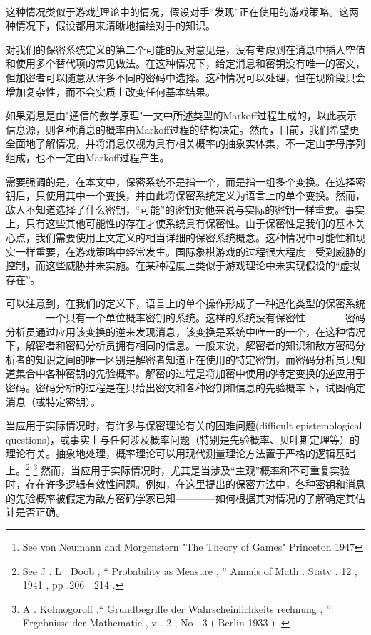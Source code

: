 \documentclass[]{article}
\begin{document}
这种情况类似于游戏\footnote{ See von Neumann and Morgenstern	"The Theory of Games" Princeton 1947}理论中的情况，假设对手“发现”正在使用的游戏策略。这两种情况下，假设都用来清晰地描绘对手的知识。


对我们的保密系统定义的第二个可能的反对意见是，没有考虑到在消息中插入空值和使用多个替代项的常见做法。在这种情况下，给定消息和密钥没有唯一的密文，但加密者可以随意从许多不同的密码中选择。这种情况可以处理，但在现阶段只会增加复杂性，而不会实质上改变任何基本结果。

如果消息是由"通信的数学原理"一文中所述类型的Markoff过程生成的，以此表示信息源，则各种消息的概率由Markoff过程的结构决定。然而，目前，我们希望更全面地了解情况，并将消息仅视为具有相关概率的抽象实体集，不一定由字母序列组成，也不一定由Markoff过程产生。

需要强调的是，在本文中，保密系统不是指一个，而是指一组多个变换。在选择密钥后，只使用其中一个变换，并由此将保密系统定义为语言上的单个变换。然而，敌人不知道选择了什么密钥，“可能”的密钥对他来说与实际的密钥一样重要。事实上，只有这些其他可能性的存在才使系统具有保密性。由于保密性是我们的基本关心点，我们需要使用上文定义的相当详细的保密系统概念。这种情况中可能性和现实一样重要，在游戏策略中经常发生。国际象棋游戏的过程很大程度上受到威胁的控制，而这些威胁并未实施。在某种程度上类似于游戏理论中未实现假设的“虚拟存在”。

可以注意到，在我们的定义下，语言上的单个操作形成了一种退化类型的保密系统————一个只有一个单位概率密钥的系统。这样的系统没有保密性————密码分析员通过应用该变换的逆来发现消息，该变换是系统中唯一的一个，在这种情况下，解密者和密码分析员拥有相同的信息。一般来说，解密者的知识和敌方密码分析者的知识之间的唯一区别是解密者知道正在使用的特定密钥，而密码分析员只知道集合中各种密钥的先验概率。解密的过程是将加密中使用的特定变换的逆应用于密码。密码分析的过程是在只给出密文和各种密钥和信息的先验概率下，试图确定消息（或特定密钥）。

当应用于实际情况时，有许多与保密理论有关的困难问题(difficult epistemological questions)，或事实上与任何涉及概率问题（特别是先验概率、贝叶斯定理等）的理论有关。抽象地处理，概率理论可以用现代测量理论方法置于严格的逻辑基础上。\footnote{See J . L . Doob , “ Probability as Measure , ” Annals of Math . Statv . 12 , 1941 , pp .206 - 214 .} \footnote{A . Kolmogoroff ,“ Grundbegriffe der Wahrscheinlichkeits rechnung , ” Ergebnisse der Mathematic , v . 2 , No . 3 ( Berlin 1933 ) .}
然而，当应用于实际情况时，尤其是当涉及“主观”概率和不可重复实验时，存在许多逻辑有效性问题。例如，在这里提出的保密方法中，各种密钥和消息的先验概率被假定为敌方密码学家已知————如何根据其对情况的了解确定其估计是否正确。
\end{document}
